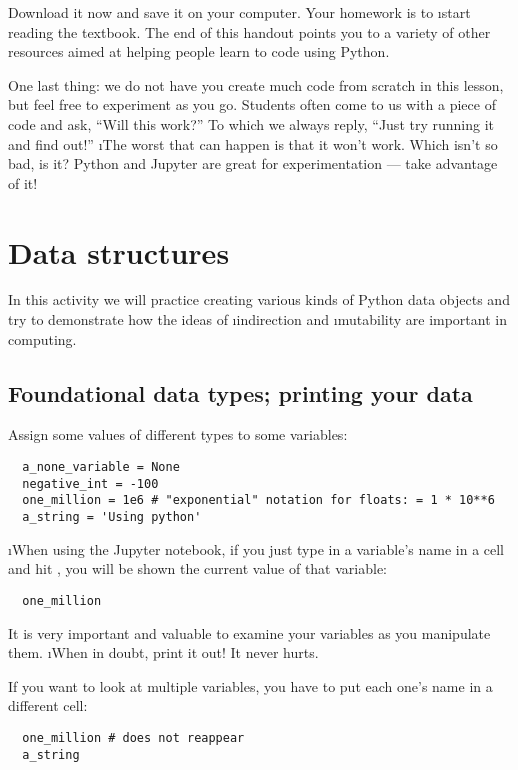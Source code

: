 \documentclass[letterpaper, 12pt, titlepage, twoside]{article}
\begin{document}
Download it now and save it on your computer. Your homework is to \i{start
  reading the textbook}. The end of this handout points you to a variety of
other resources aimed at helping people learn to code using Python.

One last thing: we do not have you create much code from scratch in this
lesson, but feel free to experiment as you go. Students often come to us with
a piece of code and ask, ``Will this work?'' To which we always reply, ``Just
try running it and find out!'' \i{The worst that can happen is that it won't
  work}. Which isn't so bad, is it? Python and Jupyter are great for
experimentation --- take advantage of it!


\newpage
\section{Data structures}

In this activity we will practice creating various kinds of Python data
objects and try to demonstrate how the ideas of \i{indirection} and
\i{mutability} are important in computing.

\subsection*{Foundational data types; printing your data}

Assign some values of different types to some variables:

\begin{lstlisting}
  a_none_variable = None
  negative_int = -100
  one_million = 1e6 # "exponential" notation for floats: = 1 * 10**6
  a_string = 'Using python'
\end{lstlisting}

\i{When using the Jupyter notebook}, if you just type in a variable's name in
a cell and hit , you will be shown the current value of that
variable:

\begin{lstlisting}
  one_million
\end{lstlisting}

It is very important and valuable to examine your variables as you manipulate
them. \i{When in doubt, print it out!} It never hurts.

If you want to look at multiple variables, you have to put each one's name in
a different cell:

\begin{lstlisting}
  one_million # does not reappear
  a_string
\end{lstlisting}
\end{document}
